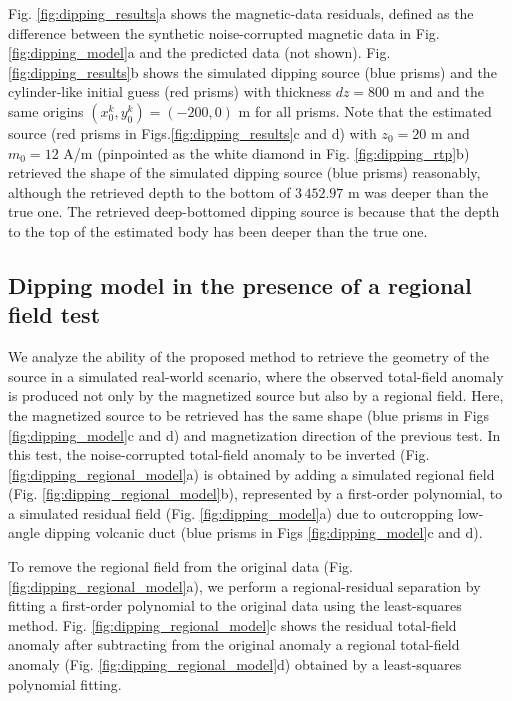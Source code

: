 Fig. \ref{fig:dipping_results}a shows the magnetic-data residuals, defined as the difference
between the synthetic noise-corrupted magnetic data in Fig. \ref{fig:dipping_model}a 
and the predicted data (not shown).
Fig. \ref{fig:dipping_results}b shows the simulated dipping source (blue prisms) and 
the cylinder-like initial guess (red prisms) with thickness $ dz = 800 $ m and 
and the same origins $(x^k_0, y^k_0) = (-200, 0) $ m for all prisms.
Note that the estimated source (red prisms in Figs.\ref{fig:dipping_results}c and d)
with $z_0 = 20$ m and $m_0 = 12$ A/m 
(pinpointed as the white diamond in Fig. \ref{fig:dipping_rtp}b)
retrieved the shape of the simulated dipping source (blue prisms) reasonably, although
the retrieved depth to the bottom of $ 3\,452.97 $ m was deeper than the true one.
The retrieved deep-bottomed dipping source is because that the depth to the top 
of the estimated body has been deeper than the true one.


\subsection{Dipping model in the presence of a regional field test}

We analyze the ability of the proposed method to retrieve the geometry of the source
in a simulated real-world scenario, where the observed total-field anomaly is produced not only by 
the magnetized source but also by a regional field. 
Here, the magnetized source to be retrieved has the same shape (blue prisms in Figs \ref{fig:dipping_model}c and d) and magnetization direction of the previous test. 
In this test, the noise-corrupted total-field anomaly to be inverted 
(Fig. \ref{fig:dipping_regional_model}a) is obtained by adding 
a simulated regional field (Fig. \ref{fig:dipping_regional_model}b), 
represented by a first-order polynomial, 
to a simulated residual field (Fig. \ref{fig:dipping_model}a) due to outcropping low-angle dipping volcanic duct (blue prisms in Figs \ref{fig:dipping_model}c and d). 

To remove the regional field from the original data (Fig. \ref{fig:dipping_regional_model}a),
we perform a regional-residual separation by fitting a first-order polynomial 
to the original data using the least-squares method.
Fig. \ref{fig:dipping_regional_model}c shows the residual total-field anomaly after subtracting from the original anomaly a regional total-field anomaly 
(Fig. \ref{fig:dipping_regional_model}d) obtained by a least-squares polynomial fitting. 

